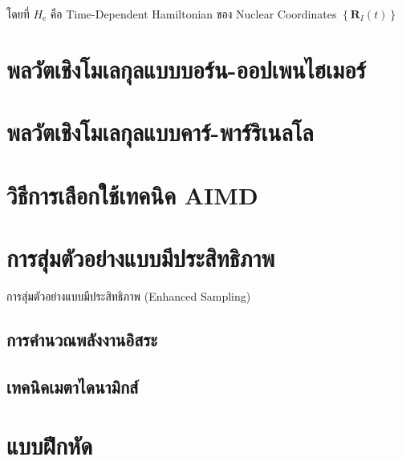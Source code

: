 \noindent โดยที่ $H_{\mathrm{e}}$ คือ Time-Dependent Hamiltonian ของ Nuclear Coordinates
$\left\{\mathbf{R}_I(t)\right\}$

\section{พลวัตเชิงโมเลกุลแบบบอร์น-ออปเพนไฮเมอร์}

\section{พลวัตเชิงโมเลกุลแบบคาร์-พาร์ริเนลโล}

\section{วิธีการเลือกใช้เทคนิค AIMD}

\section{การสุ่มตัวอย่างแบบมีประสิทธิภาพ}

การสุ่มตัวอย่างแบบมีประสิทธิภาพ (Enhanced Sampling)

\subsection{การคำนวณพลังงานอิสระ}

\subsection{เทคนิคเมตาไดนามิกส์}

\section{แบบฝึกหัด}
